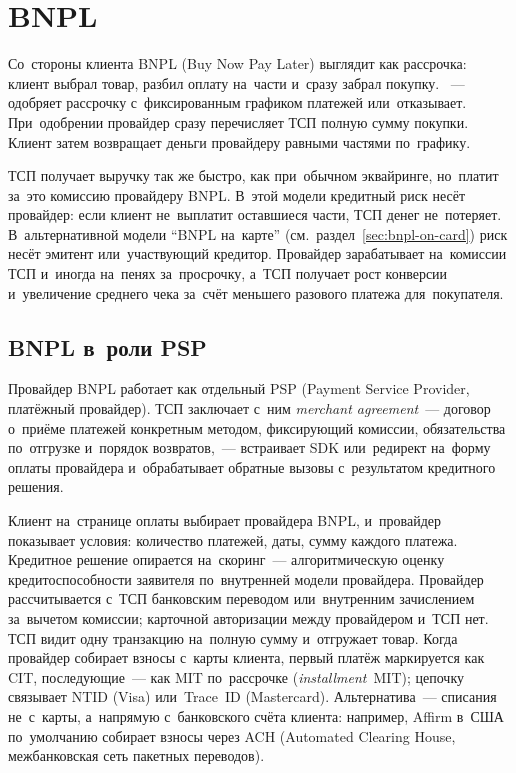 
\chapter{BNPL}\label{ch:bnpl}
Со~стороны клиента BNPL (Buy Now Pay Later) выглядит как рассрочка: клиент
выбрал товар, разбил оплату на~части и~сразу забрал покупку.
~--- одобряет рассрочку с~фиксированным графиком
платежей или~отказывает. При~одобрении провайдер сразу перечисляет ТСП полную
сумму покупки. Клиент затем возвращает деньги провайдеру равными частями
по~графику.

ТСП получает выручку так же быстро, как при~обычном эквайринге, но~платит
за~это комиссию провайдеру BNPL. В~этой модели кредитный риск несёт провайдер:
если клиент не~выплатит оставшиеся части, ТСП денег не~потеряет.
В~альтернативной модели \enquote{BNPL на~карте}
(см.~раздел~\ref{sec:bnpl-on-card}) риск несёт эмитент
или~участвующий кредитор. Провайдер зарабатывает
на~комиссии ТСП и~иногда на~пенях за~просрочку, а~ТСП получает рост конверсии
и~увеличение среднего чека за~счёт меньшего разового платежа для~покупателя.

\section{BNPL в~роли PSP}\label{sec:bnpl-as-psp}

Провайдер BNPL работает как отдельный PSP (Payment Service Provider, платёжный
провайдер). ТСП заключает с~ним
\textit{merchant agreement}~--- договор о~приёме платежей конкретным методом,
фиксирующий комиссии, обязательства по~отгрузке и~порядок возвратов,~---
встраивает SDK или~редирект на~форму оплаты провайдера и~обрабатывает обратные
вызовы с~результатом кредитного решения.

Клиент на~странице оплаты выбирает провайдера BNPL, и~провайдер показывает
условия: количество платежей, даты, сумму каждого платежа. Кредитное решение
опирается на~скоринг~--- алгоритмическую оценку кредитоспособности заявителя
по~внутренней модели провайдера. Провайдер рассчитывается с~ТСП банковским
переводом или~внутренним зачислением за~вычетом комиссии; карточной
авторизации между провайдером и~ТСП нет. ТСП видит одну транзакцию на~полную
сумму и~отгружает товар. Когда провайдер собирает взносы с~карты клиента,
первый платёж маркируется как CIT,
последующие~--- как MIT по~рассрочке (\textit{installment}~MIT); цепочку связывает NTID (Visa) или~Trace~ID
(Mastercard). Альтернатива~--- списания не~с~карты, а~напрямую с~банковского
счёта клиента: например, Affirm в~США по~умолчанию собирает взносы через ACH
(Automated Clearing House, межбанковская сеть пакетных переводов).

